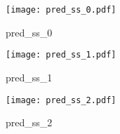\begin{answer}
\begin{figure}[H]
    \centering
    \texttt{[image: pred\_ss\_0.pdf]}
    \caption{pred\_ss\_0}
    \label{fig:enter-label}
\end{figure}

\begin{figure}[H]
    \centering
    \texttt{[image: pred\_ss\_1.pdf]}
    \caption{pred\_ss\_1}
    \label{fig:enter-label}
\end{figure}

\begin{figure}[H]
    \centering
    \texttt{[image: pred\_ss\_2.pdf]}
    \caption{pred\_ss\_2}
    \label{fig:enter-label}
\end{figure}
\end{answer}
